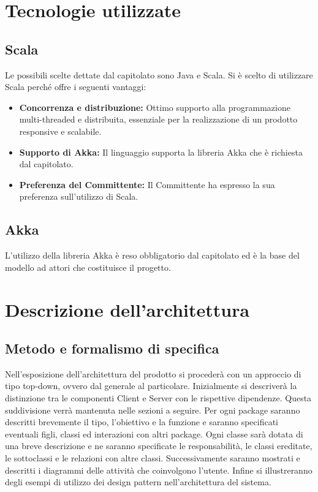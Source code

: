 \documentclass[a4paper]{article}
\begin{document}
		
	\newpage 
	\section{Tecnologie utilizzate}
	\subsection{Scala}
		Le possibili scelte dettate dal capitolato sono Java e Scala. Si è scelto di utilizzare Scala perché offre i seguenti vantaggi:
		\begin{itemize}
			\item \textbf{Concorrenza e distribuzione:} Ottimo supporto alla programmazione multi-threaded e distribuita, essenziale per la realizzazione di un prodotto responsive e scalabile.
			\item \textbf{Supporto di Akka:} Il linguaggio supporta la libreria Akka che è richiesta dal capitolato.
			\item \textbf{Preferenza del Committente:} Il Committente ha espresso la sua preferenza sull'utilizzo di Scala.
		\end{itemize}
		
	\subsection{Akka}
		L'utilizzo della libreria Akka è reso obbligatorio dal capitolato ed è la base del modello ad attori che costituisce il progetto.
	
	\newpage 
	\section{Descrizione dell'architettura}
		\subsection{Metodo e formalismo di specifica}
			Nell'esposizione dell'architettura del prodotto si procederà con un approccio di tipo top-down, ovvero dal generale al particolare.
			Inizialmente si descriverà la distinzione tra le componenti Client e Server con le rispettive dipendenze. Questa suddivisione verrà mantenuta nelle sezioni a seguire.
			Per ogni package saranno descritti brevemente il tipo, l'obiettivo e la funzione e saranno specificati eventuali figli, classi ed interazioni con altri package.
			Ogni classe sarà dotata di una breve descrizione e ne saranno specificate le responsabilità, le classi ereditate, le sottoclassi e le relazioni con altre classi.
			Successivamente saranno mostrati e descritti i diagrammi delle attività che coinvolgono l'utente.
			Infine si illustreranno degli esempi di utilizzo dei design pattern nell'architettura del sistema.
\end{document}
